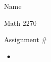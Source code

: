 \documentclass[12pt]{article}
\begin{document}
\hfill Name 

\hfill Math 2270

\hfill Assignment \#


\begin{itemize}

\item [1)]

\end{itemize}
\end{document}
